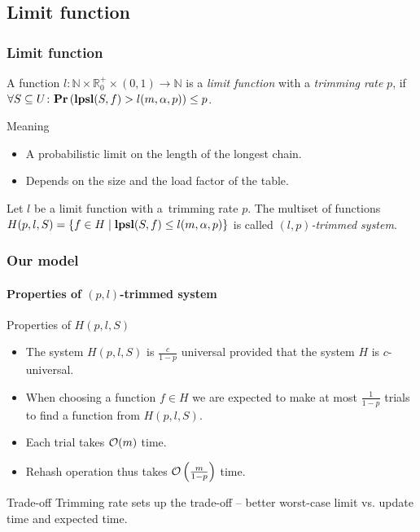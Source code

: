 \subsection{Limit function}
\begin{frame}
	\frametitle{Limit function}
		
	\begin{definition}
		A function $l\colon \mathbb{N} \times \mathbb{R}_0^+ \times (0, 1) \rightarrow \mathbb{N}$ is a \emph{limit function} with a \emph{trimming rate} $p$, if $\forall S \subseteq U\colon \mathbf{Pr}\left(\mathbf{lpsl}(S, f) > l(m, \alpha, p)\right) \leq p$.
	\end{definition}
	
	\begin{block}{Meaning}
		\begin{itemize}
			\item A probabilistic limit on the length of the longest chain.
			\item Depends on the size and the load factor of the table.
		\end{itemize}
	\end{block}
	
	\begin{definition}
		Let $l$ be a limit function with a~trimming rate $p$.
		The multiset of functions $H(p, l, S) = \{ f \in H \mid \mathbf{lpsl}(S, f) \leq l(m, \alpha, p) \}$ is called \emph{$(l, p)$-trimmed system}.
	\end{definition}
\end{frame}

\begin{frame}
	\frametitle{Our model}
	\framesubtitle{Properties of $(p, l)$-trimmed system}
	
	\begin{block}{Properties of $H(p, l, S)$}
		\begin{itemize}
			\item The system $H(p, l, S)$ is $\frac{c}{1 - p}$ universal provided that the system $H$ is $c$-universal.
			\item When choosing a function $f \in H$ we are expected to make at most $\frac{1}{1 - p}$ trials to find a function from $H(p, l, S)$.
			\item Each trial takes $\mathcal{O}(m)$ time. 
			\item Rehash operation thus takes $\mathcal{O}\left(\frac{m}{1 - p}\right)$ time.
		\end{itemize}
	\end{block}
	
	\begin{block}{Trade-off}
		Trimming rate sets up the trade-off -- better worst-case limit vs. update time and expected time.
	\end{block}
\end{frame}

